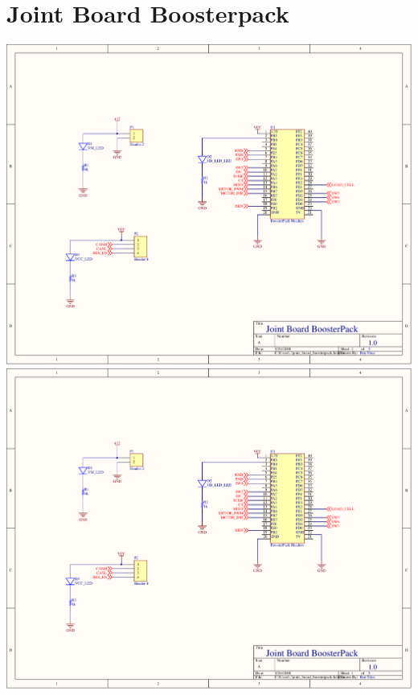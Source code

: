 \section{Joint Board Boosterpack}
\label{app:joint_board_boosterpack}
\centering
\includegraphics[page=1,width=\textwidth,angle=270]{PDFs/joint_board_boosterpack.PDF} \newpage
\includegraphics[page=2,width=\textwidth,angle=270]{PDFs/joint_board_boosterpack.PDF} \newpage

